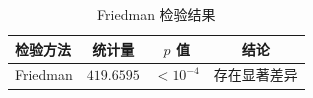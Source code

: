 \begin{table}[t]
\centering
\caption{Friedman 检验结果}
\label{tab:friedman_test}
\small
\begin{tabular}{lccc}
\toprule
检验方法 & 统计量 & $p$ 值 & 结论 \\
\midrule
Friedman & $419.6595$ & $<10^{-4}$ & 存在显著差异 \\
\bottomrule
\end{tabular}
\end{table}